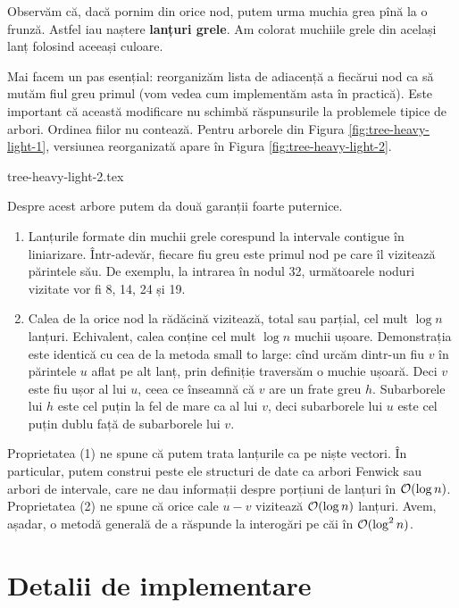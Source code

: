 \documentclass[../main.tex]{subfiles}
\begin{document}
Observăm că, dacă pornim din orice nod, putem urma muchia grea pînă la o frunză. Astfel iau naștere \textbf{lanțuri grele}. Am colorat muchiile grele din același lanț folosind aceeași culoare.

Mai facem un pas esențial: reorganizăm lista de adiacență a fiecărui nod ca să mutăm fiul greu primul (vom vedea cum implementăm asta în practică). Este important că această modificare nu schimbă răspunsurile la problemele tipice de arbori. Ordinea fiilor nu contează. Pentru arborele din Figura \ref{fig:tree-heavy-light-1}, versiunea reorganizată apare în Figura \ref{fig:tree-heavy-light-2}.

{tree-heavy-light-2.tex}

Despre acest arbore putem da două garanții foarte puternice.

\begin{enumerate}
  \item Lanțurile formate din muchii grele corespund la intervale contigue în liniarizare. Într-adevăr, fiecare fiu greu este primul nod pe care îl vizitează părintele său. De exemplu, la intrarea în nodul 32, următoarele noduri vizitate vor fi 8, 14, 24 și 19.

  \item Calea de la orice nod la rădăcină vizitează, total sau parțial, cel mult $\log n$ lanțuri. Echivalent, calea conține cel mult $\log n$ muchii ușoare. Demonstrația este identică cu cea de la metoda small to large: cînd urcăm dintr-un fiu $v$ în părintele $u$ aflat pe alt lanț, prin definiție traversăm o muchie ușoară. Deci $v$ este fiu ușor al lui $u$, ceea ce înseamnă că $v$ are un frate greu $h$. Subarborele lui $h$ este cel puțin la fel de mare ca al lui $v$, deci subarborele lui $u$ este cel puțin dublu față de subarborele lui $v$.
\end{enumerate}

Proprietatea (1) ne spune că putem trata lanțurile ca pe niște vectori. În particular, putem construi peste ele structuri de date ca arbori Fenwick sau arbori de intervale, care ne dau informații despre porțiuni de lanțuri în $\mathcal{O}(\log n)$. Proprietatea (2) ne spune că orice cale $u-v$ vizitează $\mathcal{O}(\log n)$ lanțuri. Avem, așadar, o metodă generală de a răspunde la interogări pe căi în $\mathcal{O}(\log^2 n)$.

\section{Detalii de implementare}
\end{document}
